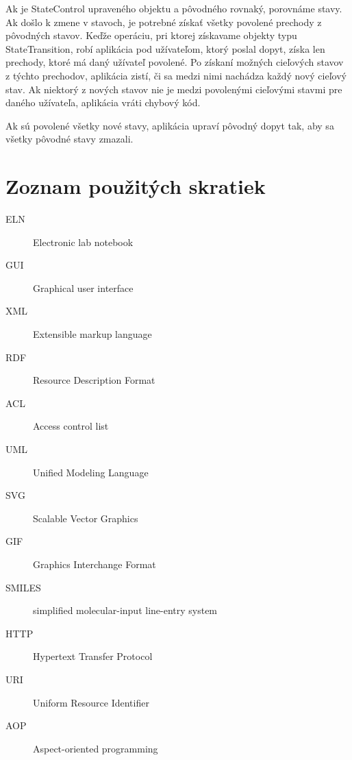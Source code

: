 \documentclass[thesis=M,slovak]{FITthesis}[2013/05/06]
\begin{document}
Ak je StateControl upraveného objektu a pôvodného rovnaký, porovnáme stavy. Ak došlo k zmene v stavoch, je potrebné získať všetky povolené prechody z pôvodných stavov. Keďže operáciu, pri ktorej získavame objekty typu StateTransition, robí aplikácia pod užívateľom, ktorý poslal dopyt, získa len prechody, ktoré má daný užívateľ povolené.
Po získaní možných cieľových stavov z týchto prechodov, aplikácia zistí, či sa medzi nimi nachádza každý nový cieľový stav. Ak niektorý z nových stavov nie je medzi povolenými cieľovými stavmi pre daného užívateľa, aplikácia vráti chybový kód.

Ak sú povolené všetky nové stavy, aplikácia upraví pôvodný dopyt tak, aby sa všetky pôvodné stavy zmazali.

\begin{conclusion}
\end{conclusion}




\appendix

\chapter{Zoznam použitých skratiek}
\begin{description}
	\item[ELN] Electronic lab notebook
	\item[GUI] Graphical user interface
	\item[XML] Extensible markup language
	\item[RDF] Resource Description Format
	\item[ACL] Access control list
	\item[UML] Unified Modeling Language
	\item[SVG] Scalable Vector Graphics
	\item[GIF] Graphics Interchange Format
	\item[SMILES] simplified molecular-input line-entry system
	\item[HTTP] Hypertext Transfer Protocol
	\item[URI] Uniform Resource Identifier
	\item[AOP] Aspect-oriented programming
\end{description}
\end{document}

